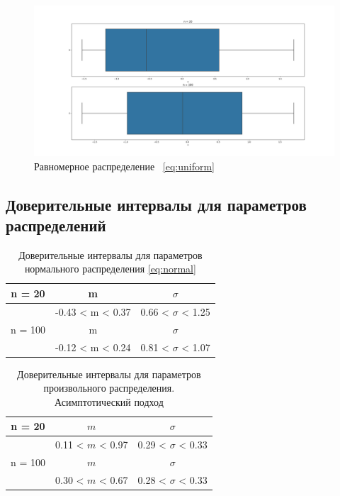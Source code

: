 \documentclass[12pt,a4paper]{article}
\begin{document}
	\begin{figure}[htbp!]
		\begin{center}
			\includegraphics[width = 1.12\linewidth]{graphics/lab2_uniform.png}
			\caption{Равномерное распределение \ \eqref{eq:uniform}}
		\end{center}
	\end{figure}

	\newpage

	\subsection{Доверительные интервалы для параметров распределений}

	\begin{table}[htbp!]
		\centering
		\begin{tabular}{ |c|c|c| }
			\hline
			n = 20 & m & $\sigma$ \\
			\hline
			& -0.43 < m < 0.37 & 0.66 < $\sigma$ < 1.25 \\
			\hline
			n = 100 & m & $\sigma$ \\
			\hline
			& -0.12 < m < 0.24 & 0.81 < $\sigma$ < 1.07 \\
			\hline
		\end{tabular}
		\caption{Доверительные интервалы для параметров нормального распределения \eqref{eq:normal}}
		\label{table:1}
	\end{table}

	\begin{table}[htbp!]
		\centering
		\begin{tabular}{ |c|c|c| }
			\hline
			n = 20 & $m$ & $\sigma$ \\
			\hline
			& 0.11 < $m$ < 0.97 & 0.29 < $\sigma$ < 0.33 \\
			\hline
			n = 100 & $m$ & $\sigma$ \\
			\hline
			& 0.30 < $m$ < 0.67 & 0.28 < $\sigma$ < 0.33 \\
			\hline
		\end{tabular}
		\caption{Доверительные интервалы для параметров произвольного распределения. Асимптотический подход}
		\label{table:2}
	\end{table}
\end{document}
